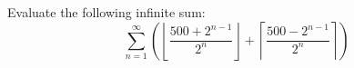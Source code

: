 Evaluate the following infinite sum:\[
\sum_{n=1}^{\infty} \left( \left\lfloor \dfrac{500 + 2^{n-1}}{2^n} \right\rfloor + \left\lceil \dfrac{500 - 2^{n-1}}{2^n} \right\rceil \right)
\]
